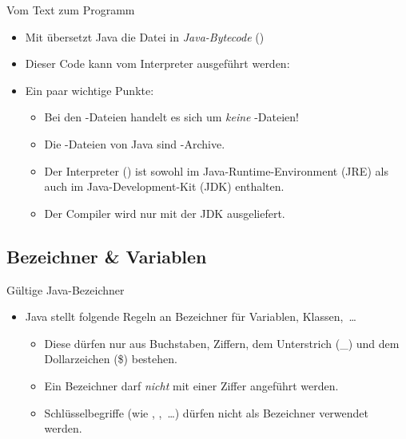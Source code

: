 \begin{frame}{Vom Text zum Programm}
    \begin{itemize}[<+(1)->]
        \widei
        \item Mit  übersetzt Java die Datei in \emph{Java-Bytecode}\pause{} ()
        \item Dieser Code kann vom Interpreter  ausgeführt werden:\pause{} 
        \item Ein paar wichtige Punkte: \begin{itemize}
            \widei
            \item Bei den -Dateien handelt es sich um \emph{keine} -Dateien!
            \item Die -Dateien von Java sind -Archive.
            \item Der Interpreter () ist sowohl im Java-Runtime-Environment (JRE) als auch im Java-Development-Kit (JDK) enthalten.
            \item Der Compiler wird nur mit der JDK ausgeliefert.
        \end{itemize}
    \end{itemize}
\end{frame}

\subsection{Bezeichner \& Variablen}

\begin{frame}{Gültige Java-Bezeichner}
    \begin{itemize}[<+(1)->]
        \widei
        \item Java stellt folgende Regeln an Bezeichner für Variablen, Klassen,~\ldots \begin{itemize}
            \widei
            \item Diese dürfen nur aus Buchstaben, Ziffern, dem Unterstrich (\_) und dem Dollarzeichen (\$) bestehen.
            \item Ein Bezeichner darf \emph{nicht} mit einer Ziffer angeführt werden.
            \item Schlüsselbegriffe (wie , ,~\ldots) dürfen nicht als Bezeichner verwendet werden.
        \end{itemize}
    \end{itemize}
\end{frame}

